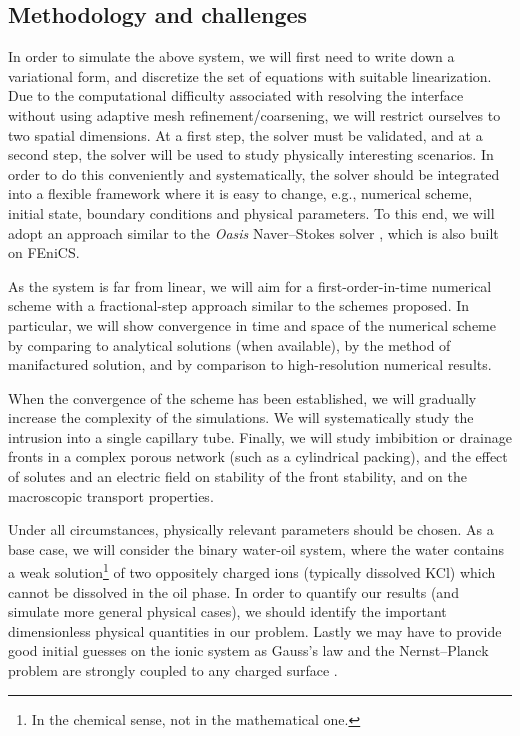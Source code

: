 \documentclass[a4paper,10pt]{article}
\begin{document}
\subsection*{Methodology and challenges}
In order to simulate the above system, we will first need to write down a variational form, and discretize the set of equations with suitable linearization.
Due to the computational difficulty associated with resolving the interface without using adaptive mesh refinement/coarsening, we will restrict ourselves to two spatial dimensions.
At a first step, the solver must be validated, and at a second step, the solver will be used to study physically interesting scenarios.
In order to do this conveniently and systematically, the solver should be integrated into a flexible framework where it is easy to change, e.g., numerical scheme, initial state, boundary conditions and physical parameters.
To this end, we will adopt an approach similar to the \emph{Oasis} Naver--Stokes solver \cite{mortensen2015}, which is also built on FEniCS.

As the system is far from linear, we will aim for a first-order-in-time numerical scheme with a fractional-step approach similar to the schemes proposed.
In particular, we will show convergence in time and space of the numerical scheme by comparing to analytical solutions (when available), by the method of manifactured solution, and by comparison to high-resolution numerical results.

When the convergence of the scheme has been established, we will gradually increase the complexity of the simulations.
We will systematically study the intrusion into a single capillary tube.
Finally, we will study imbibition or drainage fronts in a complex porous network (such as a cylindrical packing), and the effect of solutes and an electric field on stability of the front stability, and on the macroscopic transport properties.

Under all circumstances, physically relevant parameters should be chosen.
As a base case, we will consider the binary water-oil system, where the water contains a weak solution\footnote{In the chemical sense, not in the mathematical one.} of two oppositely charged ions (typically dissolved KCl) which cannot be dissolved in the oil phase.
In order to quantify our results (and simulate more general physical cases), we should identify the important dimensionless physical quantities in our problem.
Lastly we may have to provide good initial guesses on the ionic system as Gauss's law and the Nernst--Planck problem are strongly coupled to any charged surface \cite{mitscha-baude2017}.
\end{document}
